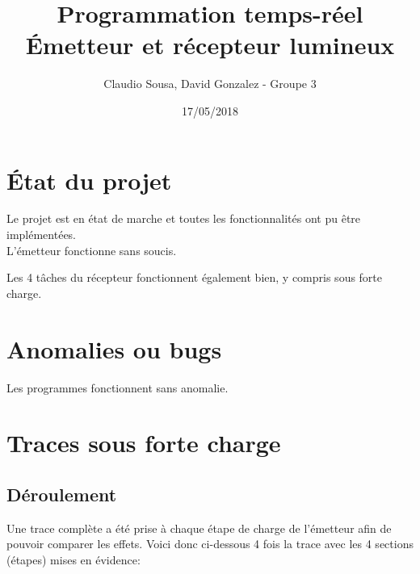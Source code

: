 \documentclass[11pt, a4paper]{article}
\begin{document}
\title
{
    \Huge{Programmation temps-réel} \\
    \Huge{Émetteur et récepteur lumineux}
}
\author
{
    \LARGE{Claudio Sousa, David Gonzalez - Groupe 3}
}
\date{17/05/2018}
\maketitle

\thispagestyle{empty}

\section{État du projet}

Le projet est en état de marche et
toutes les fonctionnalités ont pu être implémentées. \\

L'émetteur fonctionne sans soucis.

Les 4 tâches du récepteur fonctionnent également bien, y compris sous forte charge.

\section{Anomalies ou bugs}

Les programmes fonctionnent sans anomalie.

\section{Traces sous forte charge}

\subsection{Déroulement}

Une trace complète a été prise à chaque étape de charge de l'émetteur afin de pouvoir comparer les effets.
Voici donc ci-dessous 4 fois la trace avec les 4 sections (étapes) mises en évidence:
\end{document}
